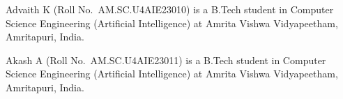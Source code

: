 \documentclass{ieeeaccess}
\begin{document}
\begin{IEEEbiographynophoto}{Advaith K}
(Roll No.\ AM.SC.U4AIE23010) is a B.Tech student in Computer Science Engineering (Artificial Intelligence) at Amrita Vishwa Vidyapeetham, Amritapuri, India.
\end{IEEEbiographynophoto}

\begin{IEEEbiographynophoto}{Akash A}
(Roll No.\ AM.SC.U4AIE23011) is a B.Tech student in Computer Science Engineering (Artificial Intelligence) at Amrita Vishwa Vidyapeetham, Amritapuri, India.
\end{IEEEbiographynophoto}
\end{document}
